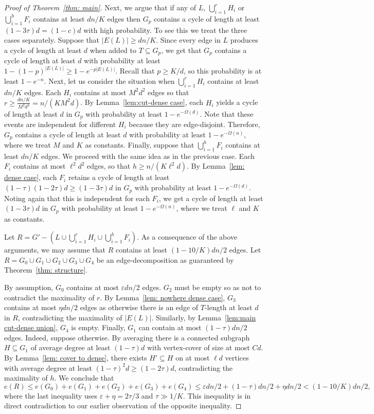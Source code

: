 \documentclass[10pt]{article}
\theoremstyle{definition}
\let\leq\leqslant
\let\geq\geqslant
\begin{document}
\begin{proof}[Proof of Theorem~\ref{thm: main}]
 Next, we argue that if any of $L$, $\bigcup_{i=1}^rH_i$ or $\bigcup_{i=1}^h F_i$ contains at least $dn/K$ edges then $G_p$ contains a cycle of length at least $(1-3\tau)d=(1-c)d$ with high probability. To see this we treat the three cases separately. Suppose that $|E(L)|\geq dn/K$. Since every edge in $L$ produces a cycle of length at least $d$ when added to $T\subseteq G_p$, we get that $G_p$ contains a cycle of length at least $d$ with probability at least $1-(1-p)^{|E(L)|}\geq 1-e^{-p|E(L)|}$. Recall that $p\geq K/d$, so this probability is at least $1-e^{-n}$. Next, let us consider the situation when $\bigcup_{i=1}^rH_i$ contains at least $dn/K$ edges. Each $H_i$ contains at most $M^2d^2$ edges so that $r\geq \frac{dn/K}{M^2d^2}= n/(KM^2d)$. By Lemma~\ref{lem:cut-dense case}, each $H_i$ yields a cycle of length at least $d$ in $G_p$ with probability at least $1-e^{-\Omega(d)}$. Note that these events are independent for different $H_i$ because they are edge-disjoint. Therefore, $G_p$ contains a cycle of length at least $d$ with probability at least $1-e^{-\Omega(n)}$, where we treat $M$ and $K$ as constants. Finally, suppose that $\bigcup_{i=1}^h F_i$ contains at least $dn/K$ edges. We proceed with the same idea as in the previous case. Each $F_i$ contains at most $\ell^2d^2$ edges, so that $h\geq n/(K\ell^2d)$. By Lemma~\ref{lem: dense case}, each $F_i$ retains a cycle of length at least $(1-\tau)(1-2\tau)d\geq (1-3\tau)d$ in $G_p$ with probability at least $1-e^{-\Omega(d)}$. Noting again that this is independent for each $F_i$, we get a cycle of length at least $(1-3\tau)d$ in $G_p$ with probability at least $1-e^{-\Omega(n)}$, where we treat $\ell$ and $K$ as constants.
 
 Let $R=G'-\left(L\cup\bigcup_{i=1}^rH_i\cup\bigcup_{i=1}^h F_i\right)$. As a consequence of the above arguments, we may assume that $R$ contains at least $(1-10/K)dn/2$ edges. Let $R=G_0\cup G_1\cup G_2\cup G_3\cup G_4$ be an edge-decomposition as guaranteed by Theorem~\ref{thm: structure}.
 
 By assumption, $G_0$ contains at most $\varepsilon dn/2$ edges. $G_2$ must be empty so as not to contradict the maximality of $r$. By Lemma~\ref{lem: nowhere dense case}, $G_3$ contains at most $\eta dn/2$ edges as otherwise there is an edge of $T$-length at least $d$ in $R$, contradicting the maximality of $|E(L)|$. Similarly, by Lemma~\ref{lem:main cut-dense union}, $G_4$ is empty. Finally, $G_1$ can contain at most $(1-\tau)dn/2$ edges. Indeed, suppose otherwise. By averaging there is a connected subgraph $H\subseteq G_1$ of average degree at least $(1-\tau)d$ with vertex-cover of size at most $Cd$. By Lemma~\ref{lem: cover to dense}, there exists $H'\subseteq H$ on at most $\ell d$ vertices with average degree at least $(1-\tau)^2d\geq (1-2\tau)d$, contradicting the maximality of $h$. We conclude that 
 $$
 e(R)\leq e(G_0)+e(G_1)+e(G_2)+e(G_3)+e(G_4)\leq \varepsilon dn/2+(1-\tau)dn/2+\eta dn/2<(1-10/K)dn/2,
 $$
 where the last inequality uses $\varepsilon+\eta=2\tau/3$ and $\tau\gg1/K$. This inequality is in direct contradiction to our earlier observation of the opposite inequality.
 \end{proof}
\end{document}
